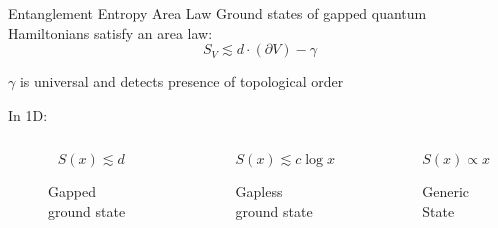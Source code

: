 \begin{frame}{Entanglement Entropy Area Law} 
\vskip-1.5cm
Ground states of gapped quantum Hamiltonians satisfy an area law: 
$$
S_V \lesssim d \cdot (\partial V) - \gamma
$$

$\gamma$ is universal and detects presence of topological order

In 1D:

\begin{columns}[T]
    \begin{column}[T]{.33\textwidth}
        \begin{figure}[h]
            \centering
            $$S(x) \lesssim d $$
            \scalebox{0.45}{
            
            }
            \caption{Gapped ground state}
        \end{figure}
    \end{column}
    \begin{column}[T]{.33\textwidth}
            \begin{figure}[h]
            \centering
            $$S(x) \lesssim c \log{x}$$
            \scalebox{0.45}{
            
            }
            \caption{Gapless ground state}
        \end{figure}
    \end{column}
    \begin{column}[T]{.33\textwidth}
            \begin{figure}[h]
            \centering
            $$S(x) \propto x $$
            \scalebox{0.45}{
            
            }
            \caption{Generic State}
        \end{figure}
    \end{column}
\end{columns}
\end{frame}
    